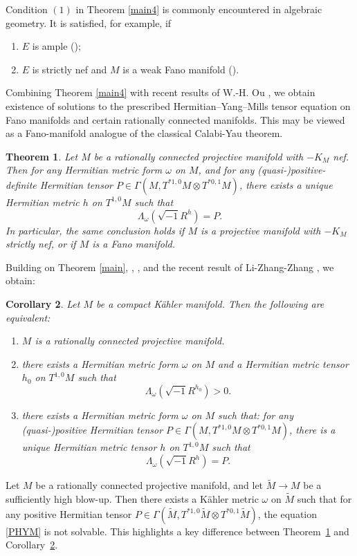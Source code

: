\documentclass[12pt, reqno]{amsart}
\theoremstyle{plain}
\newtheorem{thm}{Theorem}[section]
\newtheorem{cor}[thm]{Corollary}
\theoremstyle{definition}
\newcommand{\btheorem}{\begin{thm}}
\newcommand{\etheorem}{\end{thm}}
\newcommand{\bcorollary}{\begin{cor}}
\newcommand{\ecorollary}{\end{cor}}
\newcommand{\sq}{\sqrt{-1}}
\newcommand{\beq}{\begin{equation}}
\newcommand{\eeq}{\end{equation}}
\newcommand{\bd}{\begin{enumerate}}
\newcommand{\ed}{\end{enumerate}}
\renewcommand{\tilde}{\widetilde}
\newcommand{\ts}{\otimes}
\renewcommand{\>}{\rightarrow}
\renewcommand{\>}{\rightarrow}
\renewcommand{\tilde}{\widetilde}
\numberwithin{equation}{section} %
\begin{document}
\noindent Condition $(1)$ in Theorem \ref{main4} is commonly encountered in algebraic geometry.  It is satisfied, for example, if
\bd \item $E$ is ample (\cite{Har66});
\item  $E$ is  strictly nef and $M$ is a weak Fano manifold (\cite{LOY19, LOY21, LOY24}).
\ed 
Combining Theorem \ref{main4} with  recent results of W.-H. Ou \cite{Ou23}, we obtain existence of solutions to the prescribed Hermitian–Yang–Mills tensor equation on Fano manifolds and certain rationally connected manifolds. This may be viewed as a Fano-manifold analogue of the classical Calabi-Yau theorem.
\btheorem\label{main5} Let $M$ be 
 a rationally connected projective  manifold with $-K_M$ nef.
 Then for any Hermitian metric form $\omega$ on $M$, and for any (quasi-)positive-definite Hermitian tensor  $P\in \Gamma\left(M,T^{*1,0}M\ts T^{*0,1}M\right)$, there exists a unique Hermitian metric  $h$ on $T^{1,0}M$ such that 
\beq \Lambda_\omega\left(\sq R^h\right)=P.\eeq
In particular, the same conclusion holds if $M$ is a projective manifold with $-K_M$ strictly nef, or if $M$ is a Fano manifold.
\etheorem

\noindent 
Building on Theorem \ref{main}, \cite[Corollary~1.5]{Yang18}, \cite[Theorem~1.2]{XYY26+}, and the recent result of Li-Zhang-Zhang \cite[Theorem~1.7]{LZZ25}, we obtain:

\bcorollary\label{main7}  Let $M$ be a compact K\"ahler manifold. Then the following are equivalent:

\bd \item $M$ is a rationally connected projective manifold. 

\item there exists a Hermitian metric form $\omega$ on $M$ and a  Hermitian metric tensor $h_0$ on $T^{1,0}M$ such that $$ \Lambda_\omega\left(\sq R^{h_0}\right)>0.$$
\item there exists a Hermitian metric form $\omega$ on $M$ such that:  for any (quasi-)positive Hermitian tensor  $P\in \Gamma\left(M,T^{*1,0}M\ts  T^{*0,1}M\right)$, there is a unique Hermitian metric tensor $h$ on $T^{1,0}M$ such that 
\beq \Lambda_\omega\left(\sq R^h\right)=P.\label{PHYM}\eeq 
\ed 
\ecorollary
\noindent 
Let $M$ be a rationally connected projective manifold, 
and let $\tilde{M} \to M$ be a sufficiently high blow-up. Then there exists a K\"ahler metric $\omega$ on $\tilde M$ such that for any  positive Hermitian tensor  $P\in \Gamma\left(\tilde M,T^{*1,0}\tilde M\ts  T^{*0,1}\tilde M\right)$, the equation \eqref{PHYM} is not solvable. This highlights a key difference between Theorem~\ref{main5} and Corollary~\ref{main7}. \\
\end{document}
